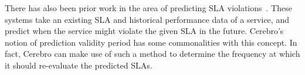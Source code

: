 There has also been prior work in the area of predicting 
SLA violations~\cite{Leitner10,6976585,Duan:2006:PIP:1142473.1142582}. 
These systems take an existing SLA and historical performance data of a service, and predict when the 
service might violate the given SLA in the future. 
Cerebro's notion of prediction validity period has some commonalities with this concept. In fact, Cerebro
can make use of such a method to determine the frequency at which it should re-evaluate the predicted
SLAs.
